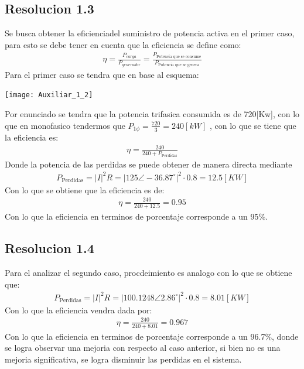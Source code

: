 \documentclass[
  11pt,
  letterpaper,
   addpoints,
  ]{exam}
\begin{document}
\begin{questions}
\begin{solution}
\subsection*{Resolucion 1.3}
Se busca obtener la eficienciadel suministro de potencia activa en el primer caso, para esto se debe tener en cuenta que la eficiencia se define como:
\begin{align}
    \eta = \frac{P_{carga}}{P_{generador}} =  \frac{P_{\text{Potencia que se consume}}}{P_{\text{Potencia que se genera}}}
\end{align}
Para el primer caso se tendra que en base al esquema:
\begin{center}
    \texttt{[image: Auxiliar\_1\_2]}
  \end{center}
Por enunciado se tendra que la potencia trifasica consumida es de 720[Kw], con lo que en monofasico tendermos que $P_{1\phi} = \frac{720}{3} = 240[kW] $ , con lo que se tiene que la eficiencia es:
\begin{align}
    \eta = \frac{240}{240 + P_{\text{Perdidas}}}
\end{align}
Donde la potencia de las perdidas se puede obtener de manera directa mediante
\begin{align}
    P_{\text{Perdidas}} = |I|^{2}R = |125 \angle -36.87^{\circ}|^{2} \cdot 0.8 = 12.5[KW]
\end{align}
Con lo que se obtiene que la eficiencia es de:
\begin{align}
    \eta = \frac{240}{240 + 12.5} = 0.95
\end{align}
Con lo que la eficiencia en terminos de porcentaje corresponde a un 95\%.
\subsection*{Resolucion 1.4}
Para el analizar el segundo caso, procdeimiento es analogo con lo que se obtiene que:
\begin{align}
    P_{\text{Perdidas}} = |I|^{2}R = |100.1248 \angle 2.86^{\circ}|^{2} \cdot 0.8 = 8.01[KW]
\end{align}
Con lo que la eficiencia vendra dada por:
\begin{align}
    \eta = \frac{240}{240 + 8.01} = 0.967
\end{align}
Con lo que la eficiencia en terminos de porcentaje corresponde a un 96.7\%, donde se logra observar una mejoria con respecto al caso anterior, si bien no es una mejoria significativa, se logra disminuir las perdidas en el sistema.

\end{solution}
\end{questions}
\end{document}
